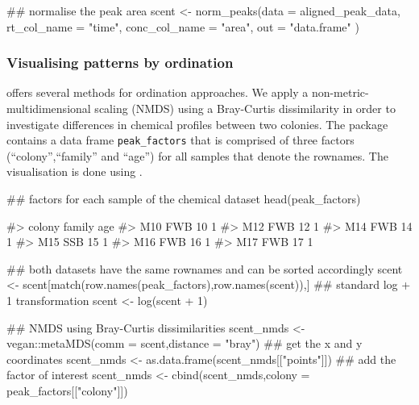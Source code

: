 \begin{Schunk}
\begin{Sinput}
## normalise the peak area 
scent <- norm_peaks(data = aligned_peak_data,
                   rt_col_name = "time",
                   conc_col_name = "area",
                   out = "data.frame" )
\end{Sinput}
\end{Schunk}

\subsubsection{Visualising patterns by
ordination}\label{visualising-patterns-by-ordination}

 offers several methods for ordination approaches. We apply a
non-metric-multidimensional scaling (NMDS) using a Bray-Curtis
dissimilarity in order to investigate differences in chemical profiles
between two colonies. The package contains a data frame
\texttt{peak\_factors} that is comprised of three factors
(``colony'',``family'' and ``age'') for all samples that denote the
rownames. The visualisation is done using .

\begin{Schunk}
\begin{Sinput}
## factors for each sample of the chemical dataset 
head(peak_factors) 
\end{Sinput}
\begin{Soutput}
#>     colony family age
#> M10    FWB     10   1
#> M12    FWB     12   1
#> M14    FWB     14   1
#> M15    SSB     15   1
#> M16    FWB     16   1
#> M17    FWB     17   1
\end{Soutput}
\begin{Sinput}
## both datasets have the same rownames and can be sorted accordingly
scent <- scent[match(row.names(peak_factors),row.names(scent)),] 
## standard log + 1 transformation
scent <- log(scent + 1)
\end{Sinput}
\end{Schunk}

\begin{Schunk}
\begin{Sinput}
## NMDS using Bray-Curtis dissimilarities
scent_nmds <- vegan::metaMDS(comm = scent,distance = "bray")
## get the x and y coordinates
scent_nmds <- as.data.frame(scent_nmds[["points"]]) 
## add the factor of interest
scent_nmds <- cbind(scent_nmds,colony = peak_factors[["colony"]]) 
\end{Sinput}
\end{Schunk}

